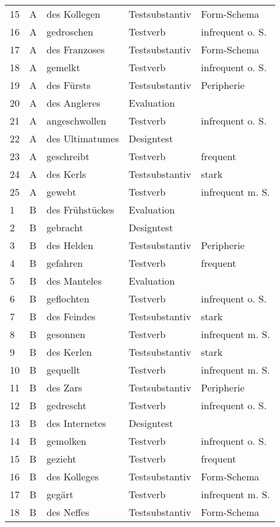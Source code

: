 \begin{small}
\begin{longtable}{lllll}
   15 & A & des Kollegen & Testsubstantiv & Form-Schema \\ 
  16 & A & gedroschen & Testverb & infrequent o. S. \\ 
 17 & A & des Franzoses & Testsubstantiv & Form-Schema \\ 
  18 & A & gemelkt & Testverb & infrequent o. S. \\ 
   19 & A & des Fürsts & Testsubstantiv & Peripherie \\ 
  20 & A & des Angleres & Evaluation &  \\ 
 21 & A & angeschwollen & Testverb & infrequent o. S. \\ 
  22 & A & des Ultimatumes & Designtest &  \\ 
  23 & A & geschreibt & Testverb & frequent \\ 
  24 & A & des Kerls & Testsubstantiv & stark \\ 
   25 & A & gewebt & Testverb & infrequent m. S. \\ 
\midrule
   1 & B & des Frühstückes & Evaluation &  \\ 
 2 & B & gebracht & Designtest &  \\ 
  3 & B & des Helden & Testsubstantiv & Peripherie \\ 
  4 & B & gefahren & Testverb & frequent \\ 
  5 & B & des Manteles & Evaluation &  \\ 
  6 & B & geflochten & Testverb & infrequent o. S. \\ 
   7 & B & des Feindes & Testsubstantiv & stark \\ 
8 & B & gesonnen & Testverb & infrequent m. S. \\ 
  9 & B & des Kerlen & Testsubstantiv & stark \\ 
 10 & B & gequellt & Testverb & infrequent m. S. \\ 
  11 & B & des Zars & Testsubstantiv & Peripherie \\ 
  12 & B & gedrescht & Testverb & infrequent o. S. \\ 
 13 & B & des Internetes & Designtest &  \\ 
 14 & B & gemolken & Testverb & infrequent o. S. \\ 
 15 & B & gezieht & Testverb & frequent \\ 
 16 & B & des Kolleges & Testsubstantiv & Form-Schema \\ 
 17 & B & gegärt & Testverb & infrequent m. S. \\ 
  18 & B & des Neffes & Testsubstantiv & Form-Schema \\ 

\end{longtable}
\end{small}
